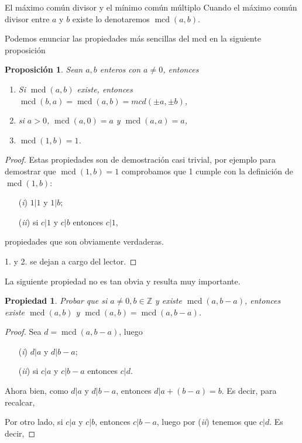 \documentclass[11pt,spanish,makeidx]{amsbook}
\newtheorem{proposicion}[teorema]{Proposici\'on}
\newtheorem{propiedad}[teorema]{Propiedad}
\theoremstyle{definition}
\theoremstyle{remark}
\newcommand \mcd{\operatorname{mcd}}
\begin{document}
\begin{section}{El máximo común divisor y el mínimo común múltiplo}
Cuando  el máximo común divisor entre $a$ y $b$ existe lo denotaremos $\mcd(a,b)$.

Podemos enunciar las propiedades más sencillas del mcd en la siguiente proposición

\begin{proposicion} Sean $a,b$ enteros con $a \not = 0$, entonces
\begin{enumerate}
\item Si $\mcd(a,b)$ existe, entonces $\mcd(b,a) = \mcd(a,b) = mcd(\pm a, \pm b)$,
\item si $a>0$,  $\mcd(a,0) = a$ y $\mcd(a,a) = a$,
\item $\mcd(1,b) = 1$.
\end{enumerate}
\end{proposicion}
\begin{proof}
Estas propiedades son de demostración casi trivial, por ejemplo para demostrar que  $\mcd(1,b) = 1$ comprobamos que 1 cumple con la definición de $\mcd(1,b)$:
\begin{enumerate}
\item[({\em i})] $ 1|1$ y $1|b$;
\item[({\em ii})] si $ c|1 $ y $c|b$ entonces $ c|1$,
\end{enumerate}
propiedades que son obviamente verdaderas.

1. y 2.  se dejan a cargo del lector. 
\end{proof}

La siguiente propiedad no es tan obvia y resulta muy importante. 
 
\begin{propiedad}\label{propiedad1}
Probar que si $a \not=0, b \in \mathbb Z$ y existe $\mcd(a,b-a)$, entonces existe $\mcd(a,b)$ y $\mcd(a,b) = \mcd(a,b-a)$. 
\end{propiedad}
\begin{proof}
Sea $d =  \mcd(a,b-a)$, luego 
\begin{enumerate}
\item[({\em i})] $ d|a$ y $d|b -a$;
\item[({\em ii})] si $ c|a $ y $c|b -a$ entonces $ c|d$.
\end{enumerate}
Ahora bien, como  $ d|a$ y $d|b -a$, entonces $  d|a +(b -a) = b$. Es decir, para recalcar,
 

\noindent Por otro lado, si  $ c|a $ y $c|b$, entonces  $c|b -a$, luego por ({\em ii}) tenemos que $c|d$. Es decir, 


\end{proof}
\end{section}
\end{document}
